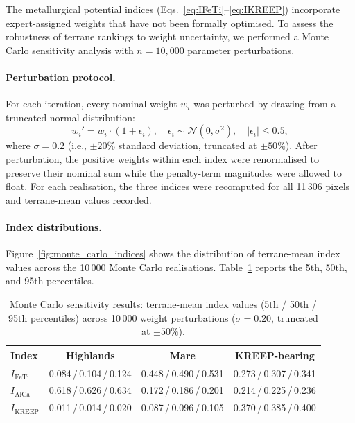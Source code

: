 \documentclass[11pt,a4paper]{article}
\begin{document}
The metallurgical potential indices (Eqs.~\ref{eq:IFeTi}--\ref{eq:IKREEP}) incorporate expert-assigned weights that have not been formally optimised. To assess the robustness of terrane rankings to weight uncertainty, we performed a Monte Carlo sensitivity analysis with $n = 10{,}000$ parameter perturbations.

\paragraph{Perturbation protocol.}
For each iteration, every nominal weight $w_i$ was perturbed by drawing from a truncated normal distribution:
\begin{equation}
    w_i' = w_i \cdot (1 + \epsilon_i), \quad \epsilon_i \sim \mathcal{N}(0, \sigma^2), \quad |\epsilon_i| \leq 0.5,
    \label{eq:perturbation}
\end{equation}
where $\sigma = 0.2$ (i.e., $\pm 20\%$ standard deviation, truncated at $\pm 50\%$). After perturbation, the positive weights within each index were renormalised to preserve their nominal sum while the penalty-term magnitudes were allowed to float. For each realisation, the three indices were recomputed for all 11\,306 pixels and terrane-mean values recorded.

\paragraph{Index distributions.}
Figure~\ref{fig:monte_carlo_indices} shows the distribution of terrane-mean index values across the 10\,000 Monte Carlo realisations. Table~\ref{tab:mc_summary} reports the 5th, 50th, and 95th percentiles.

\begin{table}[H]
\centering
\caption{Monte Carlo sensitivity results: terrane-mean index values (5th / 50th / 95th percentiles) across 10\,000 weight perturbations ($\sigma = 0.20$, truncated at $\pm 50\%$).}
\label{tab:mc_summary}
\begin{tabular}{lccc}
\toprule
\textbf{Index} & \textbf{Highlands} & \textbf{Mare} & \textbf{KREEP-bearing} \\
\midrule
$I_{\text{FeTi}}$  & 0.084\,/\,0.104\,/\,0.124 & 0.448\,/\,0.490\,/\,0.531 & 0.273\,/\,0.307\,/\,0.341 \\
$I_{\text{AlCa}}$  & 0.618\,/\,0.626\,/\,0.634 & 0.172\,/\,0.186\,/\,0.201 & 0.214\,/\,0.225\,/\,0.236 \\
$I_{\text{KREEP}}$ & 0.011\,/\,0.014\,/\,0.020 & 0.087\,/\,0.096\,/\,0.105 & 0.370\,/\,0.385\,/\,0.400 \\
\bottomrule
\end{tabular}
\end{table}
\end{document}
